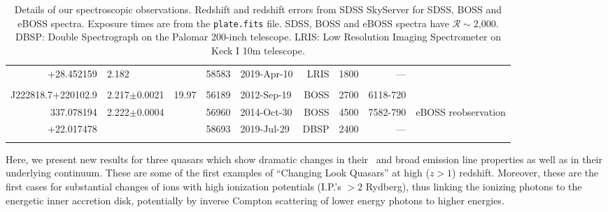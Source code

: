\documentclass[a4paper,fleqn,usenatbib]{mnras}
\begin{document}
\begin{table}
\begin{tabular}{r l   r ll   r r r r}
    +28.452159                 &  2.182                           &                          &  58583    & 2019-Apr-10     & LRIS              &  1800                   &  ---                             & \\
                                        &                                      &                          &                &                            &                    &                              &                                & \\
    J222818.7+220102.9   & 2.217$\pm$0.0021      & 19.97                &  56189    & 2012-Sep-19     & BOSS             &  2700                 &   6118-720          & \\
    337.078194                 & 2.222$\pm$0.0004      &                          &  56960    & 2014-Oct-30     & BOSS             &  4500                  &   7582-790          & eBOSS reobservation \\ 
    +22.017478                &                                      &                          &  58693    & 2019-Jul-29       & DBSP             & 2400                   &    ---                        &    \\
                                       &                                       &                          &               &                            &                   &                              &                            & \\
    \hline \hline   
  \end{tabular}
  \caption{
    Details of our spectroscopic observations.
    Redshift and redshift errors from SDSS SkyServer for SDSS, BOSS and eBOSS spectra. 
    Exposure times are from the {\tt plate.fits} file.  SDSS, BOSS and  eBOSS spectra have $\mathcal{R}\sim$2,000.
    DBSP: Double Spectrograph on the Palomar 200-inch telescope.
    LRIS:  Low Resolution Imaging Spectrometer on Keck I 10m telescope.
  } 
  \label{tab:obs_notes}
\end{table}

Here, we present new results for three quasars which show dramatic
changes in their \civ\ and \ciii broad emission line properties as
well as in their underlying continuum. These are some of the first
examples of ``Changing Look Quasars'' at high ($z>1$)
redshift. Moreover, these are the first cases for substantial changes
of ions with high ionization potentials (I.P.'s $>$2 Rydberg), thus
linking the ionizing photons to the energetic inner accretion disk,
potentially by inverse Compton scattering of lower energy photons to
higher energies.
\end{document}
